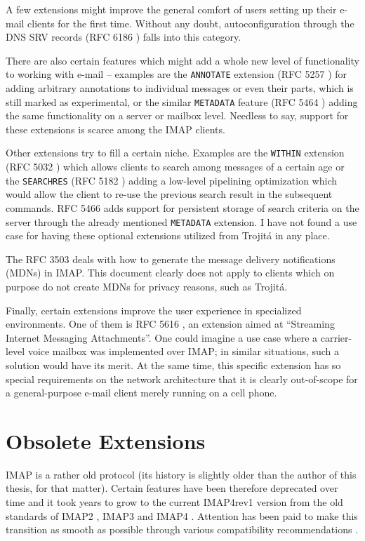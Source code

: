 \documentclass[trojita]{subfiles}
\begin{document}
A few extensions might improve the general comfort of users setting up their e-mail clients for the first time.  Without
any doubt, autoconfiguration through the DNS SRV records (RFC 6186 \cite{rfc6186}) falls into this category.

There are also certain features which might add a whole new level of functionality to working with e-mail -- examples
are the {\tt ANNOTATE} extension (RFC 5257 \cite{rfc5257}) for adding arbitrary annotations to individual messages or
even their parts, which is still marked as experimental, or the similar {\tt METADATA} feature (RFC 5464 \cite{rfc5464})
adding the same functionality on a server or mailbox level.  Needless to say, support for these extensions is scarce
among the IMAP clients.

Other extensions try to fill a certain niche.  Examples are the {\tt WITHIN} extension (RFC 5032 \cite{rfc5032}) which
allows clients to search among messages of a certain age or the {\tt SEARCHRES} (RFC 5182 \cite{rfc5182}) adding a
low-level pipelining optimization which would allow the client to re-use the previous search result in the subsequent
commands.  RFC 5466 \cite{rfc5466} adds support for persistent storage of search criteria on the server through the
already mentioned {\tt METADATA} extension.  I have not found a use case for having these optional extensions utilized
from Trojitá in any place.

The RFC 3503 \cite{rfc3503} deals with how to generate the message delivery notifications (MDNs) in IMAP.  This document
clearly does not apply to clients which on purpose do not create MDNs for privacy reasons, such as Trojitá.

Finally, certain extensions improve the user experience in specialized environments.  One of them is RFC 5616
\cite{rfc5616}, an extension aimed at ``Streaming Internet Messaging Attachments''.  One could imagine a use case where
a carrier-level voice mailbox was implemented over IMAP; in similar situations, such a solution would have its merit.
At the same time, this specific extension has so special requirements on the network architecture that it is clearly
out-of-scope for a general-purpose e-mail client merely running on a cell phone.

\section{Obsolete Extensions}

IMAP is a rather old protocol (its history is slightly older than the author of this thesis, for that matter).  Certain
features have been therefore deprecated over time and it took years to grow to the current IMAP4rev1 version from the
old standards of IMAP2 \cite{rfc1064} \cite{rfc1176}, IMAP3 \cite{rfc1203} and IMAP4 \cite{rfc1730}.  Attention has been
paid to make this transition as smooth as possible through various compatibility recommendations \cite{rfc1732}
\cite{rfc2060} \cite{rfc2061} \cite{rfc2062}.
\end{document}
